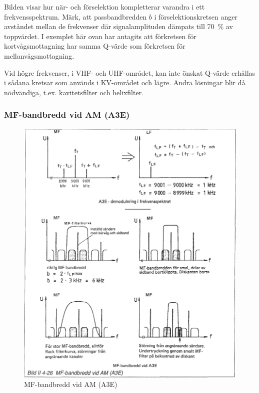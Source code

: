 Bilden visar hur när- och förselektion kompletterar varandra i ett
frekvensspektrum.  Märk, att passbandbredden \(b\) i
förselektionskretsen anger avståndet mellan de frekvenser där
signalamplituden dämpats till 70~\% av toppvärdet. I exemplet här ovan
har antagits att förkretsen för kortvågsmottagning har samma Q-värde
som förkretsen för mellanvågsmottagning.

Vid högre frekvenser, i VHF- och UHF-området, kan inte önskat Q-värde
erhållas i sådana kretsar som används i KV-området och lägre. Andra
lösningar blir då nödvändiga, t.ex. kavitetsfilter och helixfilter.

\subsubsection{MF-bandbredd vid AM (A3E)}

\begin{figure}
  \includegraphics[width=\textwidth]{images/bild_2_4-26}
  \caption{MF-bandbredd vid AM (A3E)}
  \label{fig:bildII4-26}
\end{figure}

